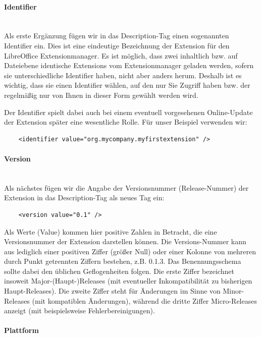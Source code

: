 \documentclass[12pt,a4paper,titlepage]{book}
\begin{document}
\paragraph*{Identifier}$~~$\\

Als erste Ergänzung fügen wir in das Description-Tag einen sogenannten Identifier ein. Dies ist eine eindeutige Bezeichnung der Extension für den LibreOffice Extensionmanager. Es ist möglich, dass zwei inhaltlich bzw. auf Dateiebene identische Extensions vom Extensionmanager geladen werden, sofern sie unterschiedliche Identifier haben, nicht aber anders herum. Deshalb ist es wichtig, dass sie einen Identifier wählen, auf den nur Sie Zugriff haben bzw. der regelmäßig nur von Ihnen in dieser Form gewählt werden wird.

Der Identifier spielt dabei auch bei einem eventuell vorgesehenen Online-Update der Extension später eine wesentliche Rolle. Für unser Beispiel verwenden wir:
\begin{lstlisting}
	<identifier value="org.mycompany.myfirstextension" />
\end{lstlisting}

\paragraph*{Version}$~~$\\

Als nächstes fügen wir die Angabe der Versionsnummer (Release-Nummer) der Extension in das Description-Tag als neues Tag ein:
\begin{lstlisting}
	<version value="0.1" />
\end{lstlisting}
Als Werte (Value) kommen hier positive Zahlen in Betracht, die eine Versionsnummer der Extension darstellen können. Die Versions-Nummer kann aus lediglich einer positiven Ziffer (größer Null) oder einer Kolonne von mehreren durch Punkt getrennten Ziffern bestehen, z.B. 0.1.3. Das Benennungsschema sollte dabei den üblichen Geflogenheiten folgen. Die erste Ziffer bezeichnet insoweit Major-(Haupt-)Releases (mit eventueller Inkompatibilität zu bisherigen Haupt-Releases). Die zweite Ziffer steht für Änderungen im Sinne von Minor-Releases (mit kompatiblen Änderungen), während die dritte Ziffer Micro-Releases anzeigt (mit beispielsweise Fehlerbereinigungen).


\paragraph*{Plattform}$~~$\\
\end{document}

